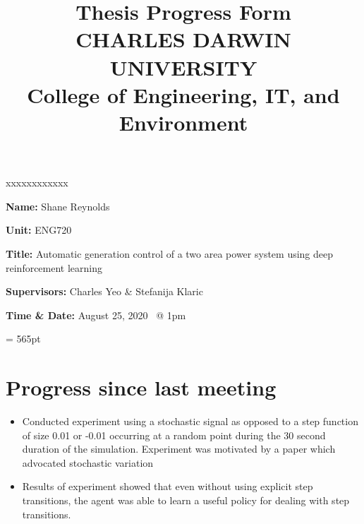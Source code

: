 \documentclass[12pt]{article}
\title{	
		Thesis Progress Form\\
		CHARLES DARWIN UNIVERSITY\\
		College of Engineering, IT, and Environment
	  }
\author{}
\date{}
\begin{document}
	
	\maketitle
	
	\begin{namelist}{xxxxxxxxxxxx}
		\item[{\bf Name:}]
			Shane Reynolds
		\item[{\bf Unit:}]
			ENG720
		\item[{\bf Title:}]
			Automatic generation control of a two area power system using deep reinforcement learning
		\item[{\bf Supervisors:}]
			Charles Yeo \& Stefanija Klaric
		\item[{\bf Time \& Date:} August 25, 2020 \ @ 1pm]
			
	\end{namelist}
	
	\pagestyle{plain} %
	\textheight = 565pt %
	
	\section{Progress since last meeting}
	\begin{itemize}
		\item Conducted experiment using a stochastic signal as opposed to a step function of size 0.01 or -0.01 occurring at a random point during the 30 second duration of the simulation. Experiment was motivated by a paper which advocated stochastic variation 
		\item Results of experiment showed that even without using explicit step transitions, the agent was able to learn a useful policy for dealing with step transitions.
	\end{itemize}
\end{document}
